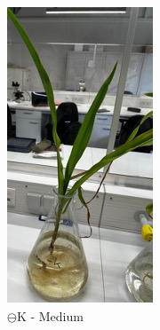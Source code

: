 \documentclass[10pt,a4paper]{article}
\begin{document}
\begin{figure}[H]
\begin{subfigure}[b]{0.215\textwidth}
				\includegraphics[width=\textwidth]{MinusK.jpg}
				\caption{$\ominus$K - Medium}
				\label{fig:minus K}
			\end{subfigure}
									\hfill
			\begin{subfigure}[b]{0.45\textwidth}

\end{subfigure}
\end{figure}
\end{document}
